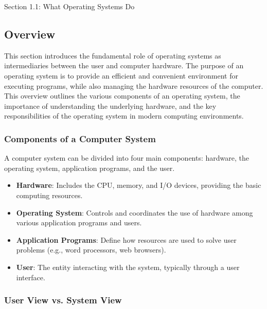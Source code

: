 \begin{notes}{Section 1.1: What Operating Systems Do}
    \subsection*{Overview}

    This section introduces the fundamental role of operating systems as intermediaries between the user and computer hardware. The purpose of an operating system is to provide an efficient and convenient environment for executing programs, while also managing the hardware resources of the computer. This overview outlines the various components of an operating system, the importance of understanding the underlying hardware, and the key responsibilities of the operating system in modern computing environments.
    
    \subsubsection*{Components of a Computer System}
    
    A computer system can be divided into four main components: hardware, the operating system, application programs, and the user.
    
    \begin{highlight}
    
    \begin{itemize}
        \item \textbf{Hardware}: Includes the CPU, memory, and I/O devices, providing the basic computing resources.
        \item \textbf{Operating System}: Controls and coordinates the use of hardware among various application programs and users.
        \item \textbf{Application Programs}: Define how resources are used to solve user problems (e.g., word processors, web browsers).
        \item \textbf{User}: The entity interacting with the system, typically through a user interface.
    \end{itemize}
    
    \end{highlight}
    
    \subsubsection*{User View vs. System View}
    

\end{notes}
